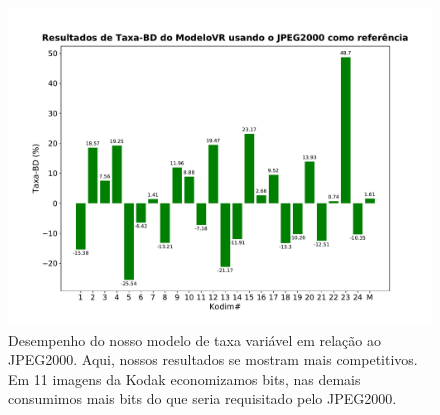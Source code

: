 \begin{figure}[h]
	\centering
	\includegraphics[width=1.0\textwidth]{figuras/bd-rate_ref_JPEG.pdf}
	\caption[Comparação do modeloVR com JPEG2000 em \acrshort{bdrate}]{Desempenho do nosso modelo de taxa variável em relação ao JPEG2000. Aqui, nossos resultados se mostram mais competitivos. Em 11 imagens da Kodak economizamos bits, nas demais consumimos mais bits do que seria requisitado pelo JPEG2000.}  	
	\label{fig:comp_jp2k_vr}
\end{figure}







